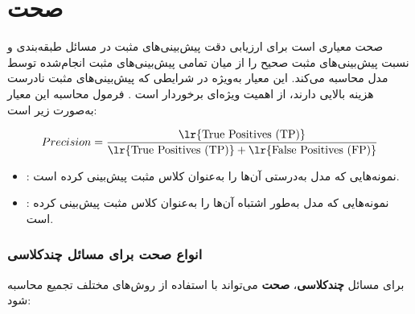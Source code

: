 \section{صحت}
صحت معیاری است برای ارزیابی دقت پیش‌بینی‌های مثبت در مسائل طبقه‌بندی و نسبت پیش‌بینی‌های مثبت صحیح را از میان تمامی پیش‌بینی‌های مثبت انجام‌شده توسط مدل محاسبه می‌کند. این معیار به‌ویژه در شرایطی که پیش‌بینی‌های مثبت نادرست هزینه بالایی دارند، از اهمیت ویژه‌ای برخوردار است \cite{ref_powers2011}. فرمول محاسبه این معیار به‌صورت زیر است:

\begin{equation}
	Precision = \frac{\text{\lr{True Positives (TP)}}}{\text{\lr{True Positives (TP)}} + \text{\lr{False Positives (FP)}}}
\end{equation}

\begin{itemize}
	\item \textbf{}: نمونه‌هایی که مدل به‌درستی آن‌ها را به‌عنوان کلاس مثبت پیش‌بینی کرده است.
	\item \textbf{}: نمونه‌هایی که مدل به‌طور اشتباه آن‌ها را به‌عنوان کلاس مثبت پیش‌بینی کرده است.
\end{itemize}

\subsubsection{انواع صحت برای مسائل چندکلاسی}

برای مسائل \textbf{چندکلاسی}، \textbf{صحت} می‌تواند با استفاده از روش‌های مختلف تجمیع محاسبه شود:

